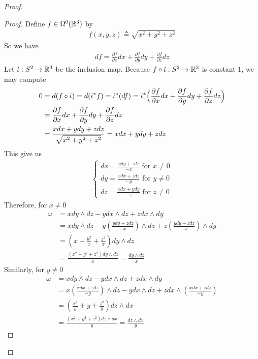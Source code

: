 \documentclass{report}
\begin{document}
\begin{proof}
\begin{proof}
Define  $f\in \Omega^0(\mathbb{R}^3)$ by 
\begin{align*}
f(x,y,z)\triangleq  \sqrt{x^2+y^2+z^2} 
\end{align*}
So we have 
\begin{align*}
df= \frac{\partial f}{\partial x}dx+ \frac{\partial f}{\partial y}dy + \frac{\partial f}{\partial z}dz
\end{align*}
Let $\dot{\iota}:S^2\rightarrow \mathbb{R}^3$ be the inclusion map. Because $f \circ \dot{\iota}:S^2\rightarrow \mathbb{R}^3$ is constant  $1$, we may compute 
\begin{align*}
  0&=d(f\circ \dot{\iota}  )=d(\dot{\iota}^* f )=\dot{\iota}^* (df)= \dot{\iota}^*\Big( \frac{\partial f}{\partial x}dx+  \frac{\partial f}{\partial y}dy + \frac{\partial f}{\partial z}dz \Big)   \\
  &=\frac{\partial f}{\partial x}dx+ \frac{\partial f}{\partial y}dy + \frac{\partial f}{\partial z}dz \\
  &=\frac{xdx+ydy+zdz}{\sqrt{x^2+y^2+z^2} }= xdx+ydy+zdz
\end{align*}
This give us 
\begin{align*}
\begin{cases}
dx= \frac{ydy + zdz}{-x}\text{ for }x\neq 0 \\
dy= \frac{xdx+zdz}{-y}\text{ for }y\neq 0\\
dz= \frac{xdx+ydy}{-z}\text{ for }z\neq 0
\end{cases}
\end{align*}
Therefore, for $x\neq 0$ 
\begin{align*}
\omega&= xdy \wedge dz- ydx\wedge  dz + zdx \wedge  dy      \\
&= xdy \wedge  dz- y (\frac{ydy+zdz}{-x}) \wedge dz+ z (\frac{ydy+zdz}{-x})\wedge  dy  \\
&=(x+ \frac{y^2}{x}+ \frac{z^2}{x})dy \wedge  dz \\
&=\frac{(x^2+y^2+z^2)dy \wedge  dz }{x}= \frac{dy \wedge  dz}{x}
\end{align*}
Similarly, for $y\neq 0$ 
\begin{align*}
\omega&=  xdy \wedge dz- ydx\wedge  dz + zdx \wedge  dy  \\
&=x(\frac{xdx+zdz}{-y}) \wedge  dz -ydx\wedge  dz + z dx \wedge  (\frac{xdx+zdz}{-y})    \\
&= (\frac{x^2}{y} +y + \frac{z^2}{y}) dz \wedge  dx \\
&=\frac{(x^2+y^2+z^2)dz\wedge  dx }{y}= \frac{dz \wedge  dx}{y}
\end{align*}

\end{proof}
\end{proof}
\end{document}
